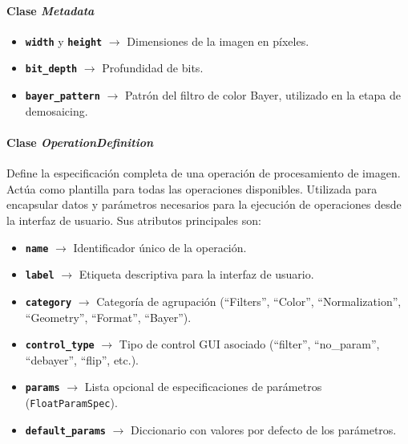 \newpage

\paragraph{Clase \textit{Metadata}} \label{par:7_3_1_2_metadata}

\begin{itemize}[noitemsep]
    \item \texttt{\textbf{width}} y \texttt{\textbf{height}} $\rightarrow$ Dimensiones de la imagen en píxeles.
    \item \texttt{\textbf{bit\_depth}} $\rightarrow$ Profundidad de bits.
    \item \texttt{\textbf{bayer\_pattern}} $\rightarrow$ Patrón del filtro de color Bayer, utilizado 
    en la etapa de demosaicing.
\end{itemize}

\paragraph{Clase \textit{OperationDefinition}} \label{par:7_3_1_3_operation_definition}
Define la especificación completa de una operación de procesamiento de imagen. Actúa como plantilla para 
todas las operaciones disponibles. Utilizada para encapsular datos y parámetros necesarios para la 
ejecución de operaciones desde la interfaz de usuario. Sus atributos principales son:

\begin{itemize}[noitemsep]
    \item \texttt{\textbf{name}} $\rightarrow$ Identificador único de la operación.
    \item \texttt{\textbf{label}} $\rightarrow$ Etiqueta descriptiva para la interfaz de usuario.
    \item \texttt{\textbf{category}} $\rightarrow$ Categoría de agrupación (``Filters'', ``Color'', 
    ``Normalization'', ``Geometry'', ``Format'', ``Bayer'').
    \item \texttt{\textbf{control\_type}} $\rightarrow$ Tipo de control GUI asociado (``filter'', ``no\_param'', 
    ``debayer'', ``flip'', etc.).
    \item \texttt{\textbf{params}} $\rightarrow$ Lista opcional de especificaciones de parámetros 
    (\texttt{FloatParamSpec}).
    \item \texttt{\textbf{default\_params}} $\rightarrow$ Diccionario con valores por defecto de los parámetros.
\end{itemize}

